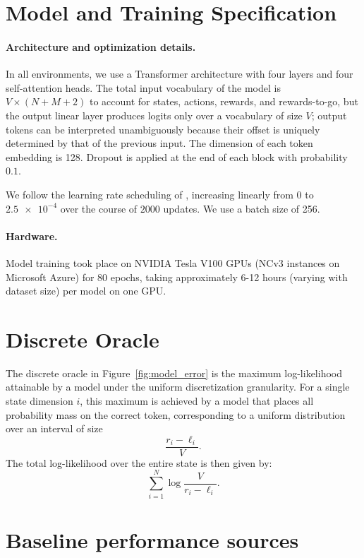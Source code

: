 \newpage
\begin{appendices}

\section{Model and Training Specification}
\label{sec:details}

\paragraph{Architecture and optimization details.}
In all environments, we use a Transformer architecture with four layers and four self-attention heads.
The total input vocabulary of the model is $V \times (N + M + 2)$ to account for states, actions, rewards, and rewards-to-go, but the output linear layer produces logits only over a vocabulary of size $V$; output tokens can be interpreted unambiguously because their offset is uniquely determined by that of the previous input.
The dimension of each token embedding is 128.
Dropout is applied at the end of each block with probability $0.1$.

We follow the learning rate scheduling of \citep{radford2018improving}, increasing linearly from 0 to $\num{2.5e-4}$ over the course of $2000$ updates.
We use a batch size of 256. 

\paragraph{Hardware.}
Model training took place on NVIDIA Tesla V100 GPUs (NCv3 instances on Microsoft Azure) for 80 epochs, taking approximately 6-12 hours (varying with dataset size) per model on one GPU.


\section{Discrete Oracle}
\label{app:oracle}
The discrete oracle in Figure~\ref{fig:model_error} is the maximum log-likelihood attainable by a model under the uniform discretization granularity.
For a single state dimension $i$, this maximum is achieved by a model that places all probability mass on the correct token, corresponding to a uniform distribution over an interval of size
\[
\frac{r_i - \ell_i}{V}.
\]
The total log-likelihood over the entire state is then given by:
\[
\sum_{i=1}^{N} \log\frac{V}{r_i - \ell_i}.
\]

\section{Baseline performance sources}
\label{app:baselines}


\end{appendices}
